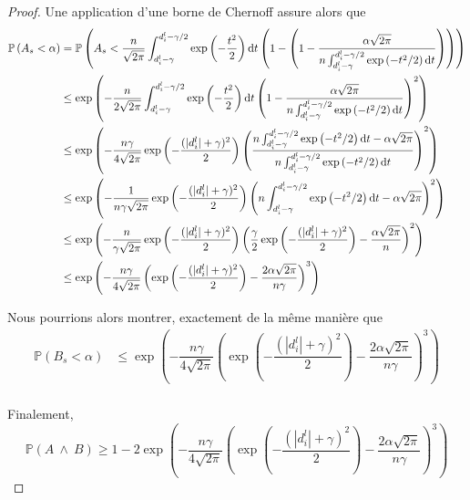 \begin{proof}
    Une application d'une borne de {\sc Chernoff} \cite{10.5555/3134214} assure alors que 
    \begin{align*}
        \mathbb P\left( A_s < \alpha \right) & = \mathbb P\left( A_s < \dfrac{n}{\sqrt{2\pi}}\int_{d^l_i - \gamma}^{d^l_i - \gamma/2} \exp\left( -\dfrac{t^2}{2} \right)\mathrm{d} t \left( 1 - \left(1 - \dfrac{\alpha\sqrt{2\pi}}{n \int_{d^l_i - \gamma}^{d^l_i - \gamma/2} \exp\left( -{t^2}/{2} \right)\mathrm{d} t} \right) \right)\right) \\
        & \leq \exp\left( -\dfrac{n}{2\sqrt{2\pi}}\int_{d^l_i - \gamma}^{d^l_i - \gamma/2} \exp\left( -\dfrac{t^2}{2} \right)\mathrm{d} t  \left(1 - \dfrac{\alpha\sqrt{2\pi}}{n \int_{d^l_i - \gamma}^{d^l_i - \gamma/2} \exp\left( -{t^2}/{2} \right)\mathrm{d} t} \right)^2\right)\\
        & \leq \exp\left( -\dfrac{n\gamma}{4\sqrt{2\pi}} \exp\left( -\dfrac{(|d_i^l| + \gamma)^2}{2} \right)  \left(\dfrac{n \int_{d^l_i - \gamma}^{d^l_i - \gamma/2} \exp\left( -{t^2}/{2} \right)\mathrm{d} t - \alpha\sqrt{2\pi}}{n \int_{d^l_i - \gamma}^{d^l_i - \gamma/2} \exp\left( -{t^2}/{2} \right)\mathrm{d} t} \right)^2\right)\\
        & \leq \exp\left( -\dfrac{1}{n\gamma\sqrt{2\pi}} \exp\left( -\dfrac{(|d_i^l| + \gamma)^2}{2} \right)  \left(n \int_{d^l_i - \gamma}^{d^l_i - \gamma/2} \exp\left( -{t^2}/{2} \right)\mathrm{d} t - \alpha\sqrt{2\pi} \right)^2\right)\\
        & \leq \exp\left( -\dfrac{n}{\gamma\sqrt{2\pi}} \exp\left( -\dfrac{(|d_i^l| + \gamma)^2}{2} \right)  \left( \dfrac{\gamma}{2}\exp\left( -\dfrac{(|d_i^l| + \gamma)^2}{2} \right)  - \dfrac{\alpha\sqrt{2\pi}}{n} \right)^2\right)\\
        & \leq \exp\left( -\dfrac{n\gamma}{4\sqrt{2\pi}}  \left(\exp\left( -\dfrac{(|d_i^l| + \gamma)^2}{2} \right)  - \dfrac{2\alpha\sqrt{2\pi}}{n\gamma} \right)^3\right)\\
    \end{align*}

    Nous pourrions alors montrer, exactement de la même manière que 
    \begin{align*}
        \mathbb P\left( B_s < \alpha \right) & \leq \exp\left( -\dfrac{n\gamma}{4\sqrt{2\pi}}  \left(\exp\left( -\dfrac{(|d_i^l| + \gamma)^2}{2} \right)  - \dfrac{2\alpha\sqrt{2\pi}}{n\gamma} \right)^3\right)\\
    \end{align*}

    Finalement,
    \[
        \mathbb P \left( A\ \wedge\ B \right) \geq 1 - 2\exp\left( -\dfrac{n\gamma}{4\sqrt{2\pi}}  \left(\exp\left( -\dfrac{(|d_i^l| + \gamma)^2}{2} \right)  - \dfrac{2\alpha\sqrt{2\pi}}{n\gamma} \right)^3\right)
    \]
\end{proof}

